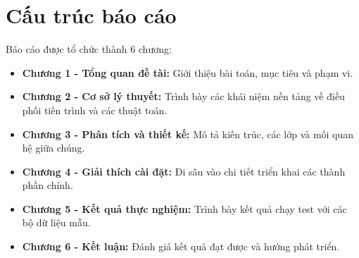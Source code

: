 \section{Cấu trúc báo cáo}

Báo cáo được tổ chức thành 6 chương:
\begin{itemize}
    \item \textbf{Chương 1 - Tổng quan đề tài:} Giới thiệu bài toán, mục tiêu và phạm vi.
    \item \textbf{Chương 2 - Cơ sở lý thuyết:} Trình bày các khái niệm nền tảng về điều phối tiến trình và các thuật toán.
    \item \textbf{Chương 3 - Phân tích và thiết kế:} Mô tả kiến trúc, các lớp và mối quan hệ giữa chúng.
    \item \textbf{Chương 4 - Giải thích cài đặt:} Đi sâu vào chi tiết triển khai các thành phần chính.
    \item \textbf{Chương 5 - Kết quả thực nghiệm:} Trình bày kết quả chạy test với các bộ dữ liệu mẫu.
    \item \textbf{Chương 6 - Kết luận:} Đánh giá kết quả đạt được và hướng phát triển.
\end{itemize}
